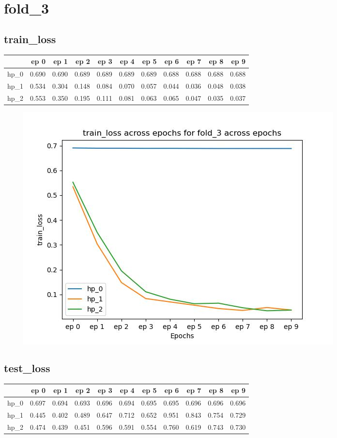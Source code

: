 \documentclass{article}
\begin{document}
\section{fold\_3}
\subsection{train\_loss}
\begin{tabular}{lrrrrrrrrrr}
\toprule
{} &   ep 0 &   ep 1 &   ep 2 &   ep 3 &   ep 4 &   ep 5 &   ep 6 &   ep 7 &   ep 8 &   ep 9 \\
\midrule
hp\_0 &  0.690 &  0.690 &  0.689 &  0.689 &  0.689 &  0.689 &  0.688 &  0.688 &  0.688 &  0.688 \\
hp\_1 &  0.534 &  0.304 &  0.148 &  0.084 &  0.070 &  0.057 &  0.044 &  0.036 &  0.048 &  0.038 \\
hp\_2 &  0.553 &  0.350 &  0.195 &  0.111 &  0.081 &  0.063 &  0.065 &  0.047 &  0.035 &  0.037 \\
\bottomrule
\end{tabular}

\begin{figure}[H]
\includegraphics[scale = 0.75]{fold_3/train_loss}
\end{figure}
\subsection{test\_loss}
\begin{tabular}{lrrrrrrrrrr}
\toprule
{} &   ep 0 &   ep 1 &   ep 2 &   ep 3 &   ep 4 &   ep 5 &   ep 6 &   ep 7 &   ep 8 &   ep 9 \\
\midrule
hp\_0 &  0.697 &  0.694 &  0.693 &  0.696 &  0.694 &  0.695 &  0.695 &  0.696 &  0.696 &  0.696 \\
hp\_1 &  0.445 &  0.402 &  0.489 &  0.647 &  0.712 &  0.652 &  0.951 &  0.843 &  0.754 &  0.729 \\
hp\_2 &  0.474 &  0.439 &  0.451 &  0.596 &  0.591 &  0.554 &  0.760 &  0.619 &  0.743 &  0.730 \\
\bottomrule
\end{tabular}
\end{document}
